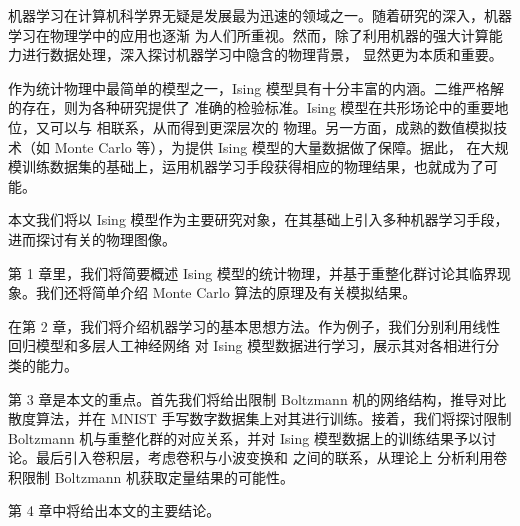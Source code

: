 机器学习在计算机科学界无疑是发展最为迅速的领域之一。随着研究的深入，机器学习在物理学中的应用也逐渐
为人们所重视。然而，除了利用机器的强大计算能力进行数据处理，深入探讨机器学习中隐含的物理背景，
显然更为本质和重要。

作为统计物理中最简单的模型之一，Ising 模型具有十分丰富的内涵。二维严格解的存在，则为各种研究提供了
准确的检验标准。Ising 模型在共形场论中的重要地位，又可以与 \AdSCFT{} 相联系，从而得到更深层次的
物理。另一方面，成熟的数值模拟技术（如 Monte Carlo 等），为提供 Ising 模型的大量数据做了保障。据此，
在大规模训练数据集的基础上，运用机器学习手段获得相应的物理结果，也就成为了可能。

本文我们将以 Ising 模型作为主要研究对象，在其基础上引入多种机器学习手段，进而探讨有关的物理图像。

第 1 章里，我们将简要概述 Ising 模型的统计物理，并基于重整化群讨论其临界现象。我们还将简单介绍
Monte Carlo 算法的原理及有关模拟结果。

在第 2 章，我们将介绍机器学习的基本思想方法。作为例子，我们分别利用线性回归模型和多层人工神经网络
对 Ising 模型数据进行学习，展示其对各相进行分类的能力。

第 3 章是本文的重点。首先我们将给出限制 Boltzmann 机的网络结构，推导对比散度算法，并在 MNIST
手写数字数据集上对其进行训练。接着，我们将探讨限制 Boltzmann 机与重整化群的对应关系，并对 Ising
模型数据上的训练结果予以讨论。最后引入卷积层，考虑卷积与小波变换和 \AdSCFT{} 之间的联系，从理论上
分析利用卷积限制 Boltzmann 机获取定量结果的可能性。

第 4 章中将给出本文的主要结论。
